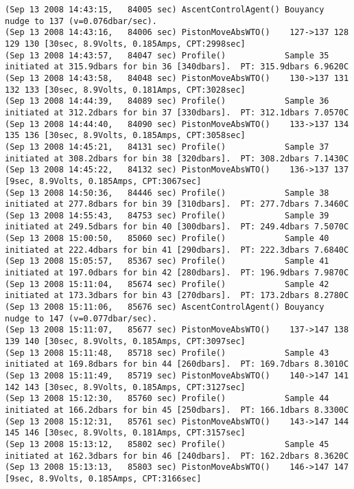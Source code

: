 {\begin{verbatim}
(Sep 13 2008 14:43:15,   84005 sec) AscentControlAgent() Bouyancy nudge to 137 (v=0.076dbar/sec).
(Sep 13 2008 14:43:16,   84006 sec) PistonMoveAbsWTO()    127->137 128 129 130 [30sec, 8.9Volts, 0.185Amps, CPT:2998sec]
(Sep 13 2008 14:43:57,   84047 sec) Profile()            Sample 35 initiated at 315.9dbars for bin 36 [340dbars].  PT: 315.9dbars 6.9620C
(Sep 13 2008 14:43:58,   84048 sec) PistonMoveAbsWTO()    130->137 131 132 133 [30sec, 8.9Volts, 0.181Amps, CPT:3028sec]
(Sep 13 2008 14:44:39,   84089 sec) Profile()            Sample 36 initiated at 312.2dbars for bin 37 [330dbars].  PT: 312.1dbars 7.0570C
(Sep 13 2008 14:44:40,   84090 sec) PistonMoveAbsWTO()    133->137 134 135 136 [30sec, 8.9Volts, 0.185Amps, CPT:3058sec]
(Sep 13 2008 14:45:21,   84131 sec) Profile()            Sample 37 initiated at 308.2dbars for bin 38 [320dbars].  PT: 308.2dbars 7.1430C
(Sep 13 2008 14:45:22,   84132 sec) PistonMoveAbsWTO()    136->137 137 [9sec, 8.9Volts, 0.185Amps, CPT:3067sec]
(Sep 13 2008 14:50:36,   84446 sec) Profile()            Sample 38 initiated at 277.8dbars for bin 39 [310dbars].  PT: 277.7dbars 7.3460C
(Sep 13 2008 14:55:43,   84753 sec) Profile()            Sample 39 initiated at 249.5dbars for bin 40 [300dbars].  PT: 249.4dbars 7.5070C
(Sep 13 2008 15:00:50,   85060 sec) Profile()            Sample 40 initiated at 222.4dbars for bin 41 [290dbars].  PT: 222.3dbars 7.6840C
(Sep 13 2008 15:05:57,   85367 sec) Profile()            Sample 41 initiated at 197.0dbars for bin 42 [280dbars].  PT: 196.9dbars 7.9870C
(Sep 13 2008 15:11:04,   85674 sec) Profile()            Sample 42 initiated at 173.3dbars for bin 43 [270dbars].  PT: 173.2dbars 8.2780C
(Sep 13 2008 15:11:06,   85676 sec) AscentControlAgent() Bouyancy nudge to 147 (v=0.077dbar/sec).
(Sep 13 2008 15:11:07,   85677 sec) PistonMoveAbsWTO()    137->147 138 139 140 [30sec, 8.9Volts, 0.185Amps, CPT:3097sec]
(Sep 13 2008 15:11:48,   85718 sec) Profile()            Sample 43 initiated at 169.8dbars for bin 44 [260dbars].  PT: 169.7dbars 8.3010C
(Sep 13 2008 15:11:49,   85719 sec) PistonMoveAbsWTO()    140->147 141 142 143 [30sec, 8.9Volts, 0.185Amps, CPT:3127sec]
(Sep 13 2008 15:12:30,   85760 sec) Profile()            Sample 44 initiated at 166.2dbars for bin 45 [250dbars].  PT: 166.1dbars 8.3300C
(Sep 13 2008 15:12:31,   85761 sec) PistonMoveAbsWTO()    143->147 144 145 146 [30sec, 8.9Volts, 0.181Amps, CPT:3157sec]
(Sep 13 2008 15:13:12,   85802 sec) Profile()            Sample 45 initiated at 162.3dbars for bin 46 [240dbars].  PT: 162.2dbars 8.3620C
(Sep 13 2008 15:13:13,   85803 sec) PistonMoveAbsWTO()    146->147 147 [9sec, 8.9Volts, 0.185Amps, CPT:3166sec]

\end{verbatim}}
